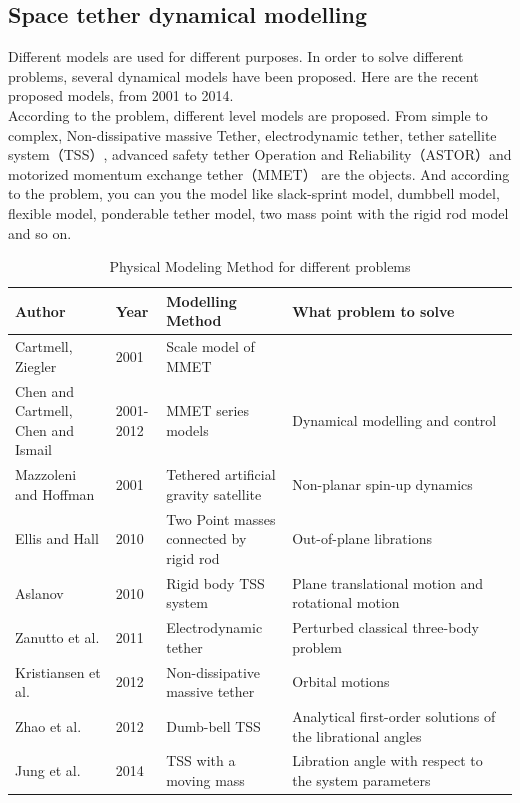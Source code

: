 \subsection{Space tether dynamical modelling}

Different models are used for different purposes. In order to solve different problems, several dynamical models have been proposed. Here are the recent proposed models, from 2001 to 2014.\\
According to the problem, different level models are proposed. From simple to complex, Non-dissipative massive Tether, electrodynamic tether, tether satellite system（TSS）, advanced safety tether Operation and Reliability（ASTOR）and motorized momentum exchange tether（MMET） are the objects. And according to the problem, you can you the model like slack-sprint model, dumbbell model, flexible model, ponderable tether model, two mass point with the rigid rod model and so on. 


\begin{figure}[ht]
\end{figure}

\begin{table}[h!]
\renewcommand\arraystretch{2}
	
	\begin{center}
	
	\caption{Physical Modeling Method for different problems}
	\begin{tabular}{p{0.2\linewidth}|p{0.1\linewidth}|p{0.25\linewidth}|p{0.45\linewidth}}
	\toprule
	\textbf{Author} & \textbf{Year} & \textbf{Modelling Method} & \textbf{What problem to solve}\\
	\midrule
	Cartmell, Ziegler & 2001 & Scale model of MMET & \\
	Chen and Cartmell, Chen and Ismail & 2001-2012 & MMET series models & Dynamical modelling and control\\
	Mazzoleni and Hoffman & 2001 & Tethered artificial gravity satellite & Non-planar spin-up dynamics\\
	Ellis and Hall&	2010&	Two Point masses connected by rigid rod & Out-of-plane librations\\
	Aslanov &	2010&	Rigid body TSS system	& Plane translational motion and rotational motion\\
	Zanutto et al.& 2011 & Electrodynamic tether & Perturbed classical three-body problem\\
	Kristiansen et al.&	2012 &	Non-dissipative massive tether & Orbital motions\\
	Zhao et al.	&2012&	Dumb-bell TSS & Analytical first-order solutions of the librational angles\\
	Jung et al. & 2014 &	TSS with a moving mass & Libration angle with respect to the system parameters\\
	\bottomrule

	\end{tabular}
	
	\end{center}
\end{table}



\newpage
